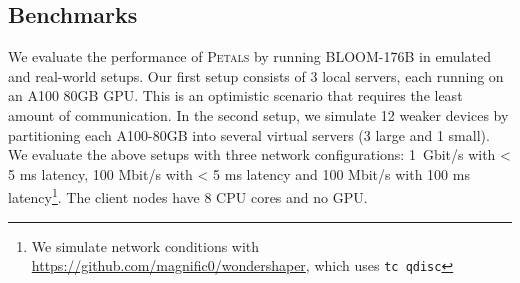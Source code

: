 
\subsection{Benchmarks}

We evaluate the performance of \textsc{Petals} by running BLOOM-176B in emulated and real-world setups. Our first setup consists of 3 local servers, each running on an A100 80GB GPU. This is an optimistic scenario that requires the least amount of communication.
In the second setup, we simulate 12 weaker devices by partitioning each A100-80GB into several virtual servers (3 large and 1 small). %
We evaluate the above setups with three network configurations: 1~Gbit/s with < 5 ms latency, 100 Mbit/s with < 5 ms latency and 100 Mbit/s with 100 ms latency\footnote{We simulate network conditions with \url{https://github.com/magnific0/wondershaper}, which uses \texttt{tc qdisc}}. The client nodes have 8 CPU cores and no GPU.


